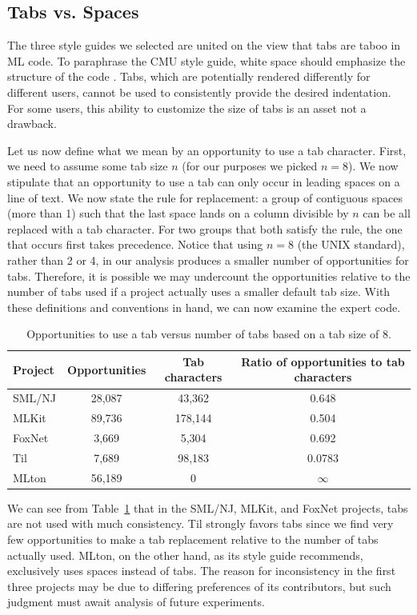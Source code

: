 \documentclass[12pt,abstracton]{scrartcl}
\begin{document}
\subsection{Tabs vs. Spaces}\label{subsec:tab}
The three style guides we selected are
united on the view that tabs are taboo in ML code. To paraphrase the CMU
style guide, white space should emphasize the structure of the code \cite{Cmu12}.
Tabs, which are potentially rendered differently for
different users, cannot be used to consistently provide the desired indentation.
For some users, this ability to customize the size of tabs is an asset not
a drawback.

Let us now define what we mean by an opportunity to use a tab character.
First, we need to assume some tab size $n$ (for our purposes we picked $n=8$).
We now stipulate that an opportunity to use a tab can only
occur in leading spaces on a line of text. We now state the rule for replacement:
a group of contiguous spaces (more than 1) such that the last space lands
on a column divisible by $n$ can be all replaced with a tab character.
For two groups that both satisfy the rule, the one that occurs first takes precedence.
Notice that using $n = 8$ (the UNIX standard), rather than 2 or 4, in our analysis produces a smaller number of
opportunities for tabs. Therefore, it is possible we may undercount the opportunities
relative to the number of tabs used if a project actually uses a smaller default tab size.
With these definitions and conventions in hand,
we can now examine the expert code.

\begin{table}[h!]
\centering
\begin{tabular}{|l||c|c||c|}
\hline
Project & Opportunities & Tab characters & Ratio of opportunities to tab characters \\ \hline\hline
SML/NJ & 28,087 & 43,362 & 0.648 \\
MLKit & 89,736 & 178,144 & 0.504 \\
FoxNet & 3,669 & 5,304 & 0.692 \\
Til & 7,689 & 98,183 & 0.0783 \\
MLton & 56,189 & 0 & $\infty$ \\ \hline
\end{tabular}
\caption{Opportunities to use a tab versus number of tabs based on a tab size of 8.}
\label{table:tabs}
\end{table}

We can see from Table~\ref{table:tabs} that
in the SML/NJ, MLKit, and FoxNet projects,
tabs are not used with much consistency. 
Til strongly favors tabs since we find very few opportunities to make a tab replacement relative to the number of tabs actually used.
MLton, on the other hand, as its style guide recommends, exclusively
uses spaces instead of tabs. The reason for inconsistency in the first three projects
may be due to differing preferences of its contributors, but such judgment
must await analysis of future experiments.
\end{document}
